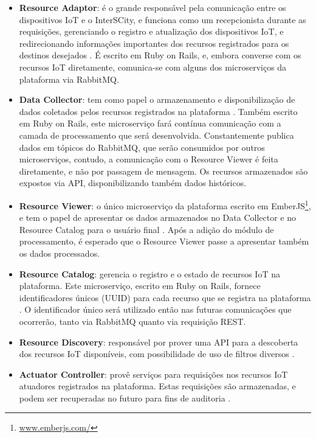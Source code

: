 \begin{itemize}
    \item \textbf{Resource Adaptor}: é o grande responsável pela comunicação
entre os dispositivos IoT e o InterSCity, e funciona como um recepcionista
durante as requisições, gerenciando o registro e atualização dos
dispositivos IoT, e redirecionando informações importantes dos recursos
registrados para os destinos desejados \cite{delesposte2017}. É escrito em
Ruby on Rails, e, embora converse com os recursos IoT diretamente, comunica-se
com alguns dos microserviços da plataforma via RabbitMQ.

    \item \textbf{Data Collector}: tem como papel o armazenamento e
disponibilização de dados coletados pelos recursos registrados na plataforma
\cite{delesposte2017}. Também escrito em Ruby on Rails, este microserviço fará
contínua comunicação com a camada de processamento que será desenvolvida.
Constantemente publica dados em tópicos do RabbitMQ, que serão consumidos por
outros microserviços, contudo, a comunicação com o Resource Viewer é feita
diretamente, e não por passagem de mensagem. Os recursos armazenados são
expostos via API, disponibilizando também dados históricos.

    \item \textbf{Resource Viewer}: o único microserviço da plataforma escrito em
EmberJS\footnote{\url{www.emberjs.com/}}, e tem o papel de apresentar os dados
armazenados no Data Collector e no Resource Catalog para o usuário final
\cite{delesposte2017}. Após a adição do módulo de processamento, é esperado que
o Resource Viewer passe a apresentar também os dados processados.

    \item \textbf{Resource Catalog}: gerencia o registro e o estado de recursos
IoT na plataforma. Este microserviço, escrito em Ruby on Rails, fornece
identificadores únicos (UUID) para cada recurso que se registra na plataforma
\cite{delesposte2017}. O identificador único será utilizado então nas futuras
comunicações que ocorrerão, tanto via RabbitMQ quanto via requisição REST.

    \item \textbf{Resource Discovery}: responsável por prover uma API para a
descoberta dos recursos IoT disponíveis, com possibilidade de uso de filtros
diversos \cite{delesposte2017}.

    \item \textbf{Actuator Controller}: provê serviços para requisições nos
recursos IoT atuadores registrados na plataforma\cite{delesposte2017}. Estas
requisições são armazenadas, e podem ser recuperadas no futuro para fins
de auditoria \cite{delesposte2017}.

\end{itemize}


